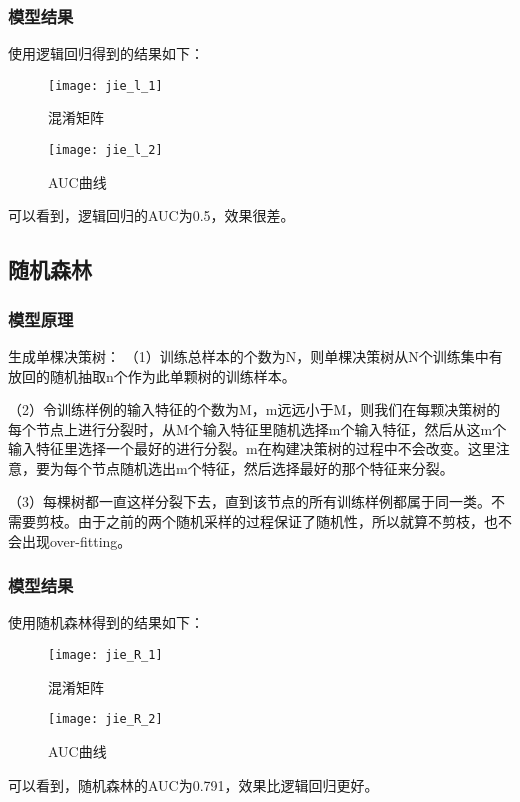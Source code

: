 \documentclass[withoutpreface,bwprint]{cumcmthesis} %
\begin{document}
\subsubsection{模型结果}
\par 使用逻辑回归得到的结果如下：
\begin{figure}[H]
	\centering
	\centerline{\texttt{[image: jie\_l\_1]}}  
	\begin{center}
		\caption{混淆矩阵}
	\end{center}
\end{figure}

\begin{figure}[H]
	\centering
	\centerline{\texttt{[image: jie\_l\_2]}}  
	\begin{center}
		\caption{AUC曲线}
	\end{center}
\end{figure}

\par 可以看到，逻辑回归的AUC为0.5，效果很差。

\subsection{随机森林}
\subsubsection{模型原理}
\par  生成单棵决策树：
（1）训练总样本的个数为N，则单棵决策树从N个训练集中有放回的随机抽取n个作为此单颗树的训练样本。

（2）令训练样例的输入特征的个数为M，m远远小于M，则我们在每颗决策树的每个节点上进行分裂时，从M个输入特征里随机选择m个输入特征，然后从这m个输入特征里选择一个最好的进行分裂。m在构建决策树的过程中不会改变。这里注意，要为每个节点随机选出m个特征，然后选择最好的那个特征来分裂。

（3）每棵树都一直这样分裂下去，直到该节点的所有训练样例都属于同一类。不需要剪枝。由于之前的两个随机采样的过程保证了随机性，所以就算不剪枝，也不会出现over-fitting。


\subsubsection{模型结果}
\par 使用随机森林得到的结果如下：
\begin{figure}[H]
	\centering
	\centerline{\texttt{[image: jie\_R\_1]}}  
	\begin{center}
		\caption{混淆矩阵}
	\end{center}
\end{figure}

\begin{figure}[H]
	\centering
	\centerline{\texttt{[image: jie\_R\_2]}}  
	\begin{center}
		\caption{AUC曲线}
	\end{center}
\end{figure}

\par 可以看到，随机森林的AUC为0.791，效果比逻辑回归更好。
\end{document}
